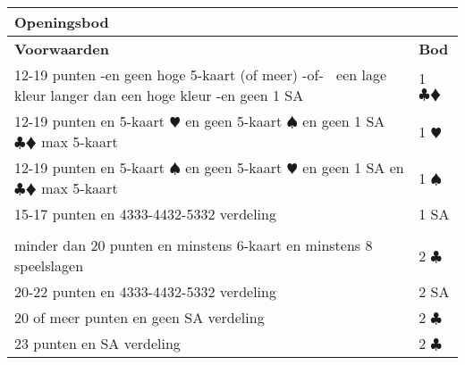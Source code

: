 \documentclass[12pt,a4paper]{report}
\begin{document}
\begin{tabular}{|p{7cm}|l|}
	\hline 
	\textbf{Openingsbod} & \\
	\hline 
	\textbf{Voorwaarden}  &\textbf{Bod} \\ 
	\hline 
	
	12-19 punten\newline
	-en geen hoge 5-kaart (of meer) -of-\newline
	$~$ een lage kleur langer dan een hoge kleur\newline
	-en geen 1 SA
	   &1 $\clubsuit \vardiamondsuit$  \\ 
	\hline 
	
	12-19 punten\newline 
	en 5-kaart $\varheartsuit$\newline 
	en geen 5-kaart $\spadesuit$  \newline
	en geen 1 SA\newline
	   $\clubsuit \vardiamondsuit$ max 5-kaart
	   & 1 $\varheartsuit$  \\    
	\hline
		 
	12-19 punten\newline 
	en 5-kaart $\spadesuit$\newline 
	en geen 5-kaart $\varheartsuit$\newline
	en geen 1 SA\newline
	en $\clubsuit \vardiamondsuit$ max 5-kaart
	   & 1 $\spadesuit$  \\     
	\hline 
	
	15-17 punten\newline
	en 4333-4432-5332 verdeling & 1 SA \\ 
	\hline 
	
	   &  \\ 
	\hline 
	
	minder dan 20 punten\newline
	en minstens 6-kaart\newline
	en minstens 8 speelslagen
	   &2 $\clubsuit$ \\ 
	\hline 
	
	20-22 punten\newline 
	en 4333-4432-5332 verdeling
	   & 2 SA \\ 
	\hline 
	
	20 of meer punten\newline 
	en geen SA verdeling &2 $\clubsuit$ \\ 
	\hline 
	
	23 punten\newline
	en SA verdeling&2 $\clubsuit$ \\ 
	\hline 
\end{tabular} 
\newpage
\end{document}
